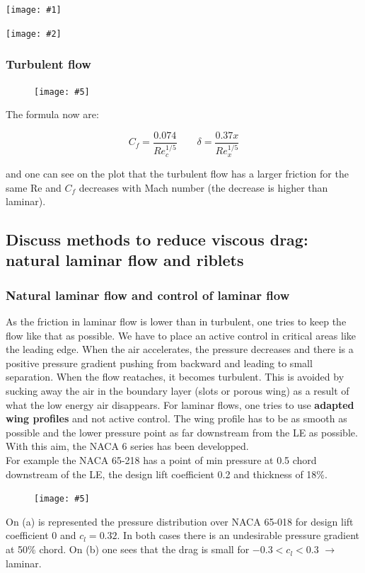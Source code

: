 \documentclass[british,french,11pt, a4paper, openany]{article}
\newcommand{\wrapfig}[6]{%
	\begin{figure}%
		\vspace{-5mm}%
		\texttt{[image: \#5]}%
		\captionof{figure}{}%
		\label{#6}%
	\end{figure}%
}
\newcommand{\minifig}[6]{
	\begin{center}%
		\begin{minipage}{#5\textwidth}%
			\texttt{[image: \#1]}%
			\captionof{figure}{}%
			\label{#1}%
		\end{minipage}%
		\begin{minipage}{#6\textwidth}%
			\texttt{[image: \#2]}%
			\captionof{figure}{}%
			\label{#2}%
		\end{minipage}%
	\end{center}
}
\begin{document}
\minifig{ch4/2}{ch4/3}{0.15}{0.2}{0.49}{0.49}

\subsubsection{Turbulent flow}
\wrapfig{9}{l}{8}{0.15}{ch4/4}{ch4/4}
The formula now are:

\begin{equation}
C_f = \frac{0.074}{Re_c^{1/5}} \qquad \delta = \frac{0.37x}{Re_x^{1/5}}
\end{equation}

and one can see on the plot that the turbulent flow has a larger friction for the same Re and $C_f$ decreases with Mach number (the decrease is higher than laminar).

\subsection{Discuss methods to reduce viscous drag: natural laminar flow and riblets}

\subsubsection{Natural laminar flow and control of laminar flow}
As the friction in laminar flow is lower than in turbulent, one tries to keep the flow like that as possible. We have to place an active control in critical areas like the leading edge. When the air accelerates, the pressure decreases and there is a positive pressure gradient pushing from backward and leading to small separation. When the flow reataches, it becomes turbulent. This is avoided by sucking away the air in the boundary layer (slots or porous wing) as a result of what the low energy air disappears. For laminar flows, one tries to use \textbf{adapted wing profiles} and not active control. The wing profile has to be as smooth as possible and the lower pressure point as far downstream from the LE as possible. With this aim, the NACA 6 series has been developped. \\

For example the NACA 65-218 has a point of min pressure at 0.5 chord downstream of the LE, the design lift coefficient 0.2 and thickness of 18\%. 

\wrapfig{6}{l}{5}{0.15}{ch4/5}{ch4/5}
On (a) is represented the pressure distribution over NACA 65-018 for design lift coefficient 0 and $c_l=0.32$. In both cases there is an undesirable pressure gradient at 50\% chord. On (b) one sees that the drag is small for $-0.3 < c_l <0.3$ $\rightarrow$ laminar. 
\end{document}
